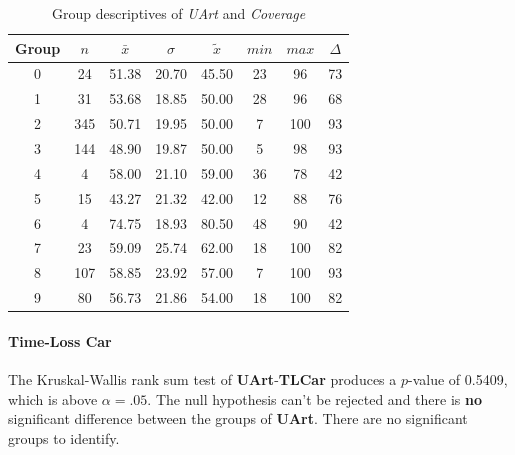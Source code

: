 \begin{table}[ht]
	\small
	\centering
    \begin{tabular}{c|c|c|c|c|c|c|c}
        \toprule
        Group & $n$ & $\bar{x}$ & $\sigma$ & $\tilde{x}$ & $min$ & $max$ & $\Delta$ \\
        \midrule
        0 & 24  & 51.38 & 20.70 & 45.50 & 23 & 96  & 73 \\ 
        1 & 31  & 53.68 & 18.85 & 50.00 & 28 & 96  & 68 \\ 
        2 & 345 & 50.71 & 19.95 & 50.00 & 7  & 100 & 93 \\ 
        3 & 144 & 48.90 & 19.87 & 50.00 & 5  & 98  & 93 \\ 
        4 & 4   & 58.00 & 21.10 & 59.00 & 36 & 78  & 42 \\ 
        5 & 15  & 43.27 & 21.32 & 42.00 & 12 & 88  & 76 \\ 
        6 & 4   & 74.75 & 18.93 & 80.50 & 48 & 90  & 42 \\ 
        7 & 23  & 59.09 & 25.74 & 62.00 & 18 & 100 & 82 \\ 
        8 & 107 & 58.85 & 23.92 & 57.00 & 7  & 100 & 93 \\ 
        9 & 80  & 56.73 & 21.86 & 54.00 & 18 & 100 & 82 \\ 
        \bottomrule
      \end{tabular}
    \caption{Group descriptives of \textit{UArt} and \textit{Coverage}}
    \label{tbl:descriptives_baysis_initiator_UArt_Cov}
\end{table}

\paragraph{Time-Loss Car}
The Kruskal-Wallis rank sum test of \textbf{UArt}-\textbf{TLCar} produces a $p$-value of 0.5409, which is above $\alpha=.05$. The null hypothesis can't be rejected and there is \textbf{no} significant difference between the groups of \textbf{UArt}. There are no significant groups to identify.

